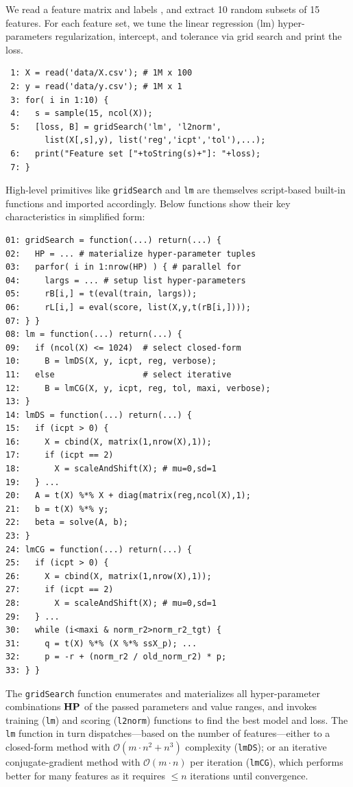 \begin{example} [GridSearch LM] \label{ex:1} We read a feature matrix  and labels , and extract 10 random subsets of 15 features. For each feature set, we tune the linear regression (lm) hyper-parameters regularization, intercept, and tolerance via grid search and print the loss.
\begin{lstlisting}
 1: X = read('data/X.csv'); # 1M x 100
 2: y = read('data/y.csv'); # 1M x 1
 3: for( i in 1:10) {
 4:   s = sample(15, ncol(X));
 5:   [loss, B] = gridSearch('lm', 'l2norm',
        list(X[,s],y), list('reg','icpt','tol'),...);
 6:   print("Feature set ["+toString(s)+"]: "+loss);
 7: }
\end{lstlisting}
High-level primitives like \texttt{gridSearch} and \texttt{lm} are themselves script-based built-in functions and imported accordingly. Below functions show their key characteristics in simplified form:
\begin{lstlisting}
01: gridSearch = function(...) return(...) {
02:   HP = ... # materialize hyper-parameter tuples
03:   parfor( i in 1:nrow(HP) ) { # parallel for
04:     largs = ... # setup list hyper-parameters
05:     rB[i,] = t(eval(train, largs));
06:     rL[i,] = eval(score, list(X,y,t(rB[i,])));
07: } }
08: lm = function(...) return(...) { 
09:   if (ncol(X) <= 1024)  # select closed-form
10:     B = lmDS(X, y, icpt, reg, verbose);
11:   else                  # select iterative
12:     B = lmCG(X, y, icpt, reg, tol, maxi, verbose);
13: } 
14: lmDS = function(...) return(...) {
15:   if (icpt > 0) {
16:     X = cbind(X, matrix(1,nrow(X),1));
17:     if (icpt == 2)
18:       X = scaleAndShift(X); # mu=0,sd=1
19:   } ...
20:   A = t(X) %*% X + diag(matrix(reg,ncol(X),1);
21:   b = t(X) %*% y;
22:   beta = solve(A, b);
23: } 
24: lmCG = function(...) return(...) {
25:   if (icpt > 0) {
26:     X = cbind(X, matrix(1,nrow(X),1));
27:     if (icpt == 2)
28:       X = scaleAndShift(X); # mu=0,sd=1
29:   } ...
30:   while (i<maxi & norm_r2>norm_r2_tgt) {
31:     q = t(X) %*% (X %*% ssX_p); ...
32:     p = -r + (norm_r2 / old_norm_r2) * p;
33: } }
\end{lstlisting}
The \texttt{gridSearch} function enumerates and materializes all hyper-parameter combinations $\mathbf{HP}$ of the passed parameters and value ranges, and invokes training (\texttt{lm}) and scoring (\texttt{l2norm}) functions to find the best model and loss. The \texttt{lm} function in turn dispatches---based on the number of features---either to a closed-form method with $\mathcal{O}(m\cdot n^2 + n^3)$ complexity (\texttt{lmDS}); or an iterative conjugate-gradient method with $\mathcal{O}(m \cdot n)$ per iteration (\texttt{lmCG}), which performs better for many features as it requires $\leq n$ iterations until convergence.
\vspace{-0.1cm}
\end{example}

